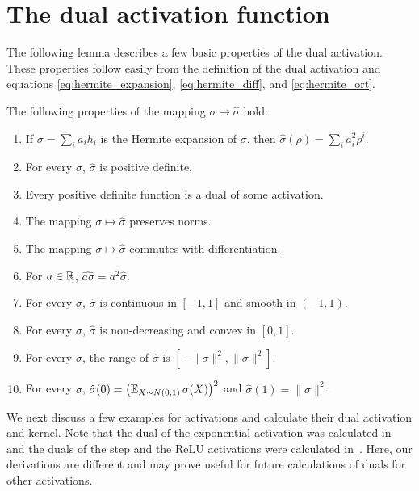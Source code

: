 \section{The dual activation function} \label{dualact:sec}
%
The following lemma describes a few basic properties of the dual activation. These properties follow easily from the definition of the dual activation and equations
\eqref{eq:hermite_expansion}, \eqref{eq:hermite_diff}, and
\eqref{eq:hermite_ort}.
\begin{lemma}\label{lem:dual_activation}
The following properties of the mapping $\sigma\mapsto \hat\sigma$ hold:
\begin{enumerate}[label=(\alph*)]
\item If $\sigma =\sum_{i} a_i h_i$ is the Hermite expansion of
  $\sigma$, then  $\hat\sigma(\rho) = \sum_i a_i^2 \rho^i$.
	\label{lem:da_1}
\item For every $\sigma$, $\hat\sigma$ is positive definite.
	\label{lem:da_2}
\item Every positive definite function is a dual of some activation.
	\label{lem:da_3}
\item The mapping $\sigma\mapsto\hat\sigma$ preserves norms.
	\label{lem:da_4}
\item The mapping $\sigma\mapsto\hat\sigma$ commutes with differentiation.
	\label{lem:da_5}
\item For $a\in{\mathbb R}$, $\widehat{a\sigma} = a^2\hat\sigma$.
	\label{lem:da_6}
\item For every $\sigma$, $\hat{\sigma}$ is continuous in $[-1,1]$ and smooth in $(-1,1)$.
	\label{lem:da_7}
\item For every $\sigma$, $\hat{\sigma}$ is non-decreasing and convex in $[0,1]$.
	\label{lem:da_8}
\item For every $\sigma$, the range of $\hat{\sigma}$ is $\left[-\|\sigma\|^2,\|\sigma\|^2\right]$.
\item For every $\sigma$, $\hat \sigma(0) = \left(\operatorname*{\mathbb{E}}_{X\sim N(0,1)}\sigma(X)\right)^2$ and $\hat{\sigma}(1)=\|\sigma\|^2$.
	\label{lem:da_9}
\end{enumerate}
\end{lemma}
\noindent
We next discuss a few examples for activations and calculate their dual
activation and kernel. Note that the dual of the exponential activation
was calculated in~\cite{mairal2014convolutional} and the duals of the step and the ReLU activations were calculated in~\cite{cho2009kernel}.
Here, our derivations are different and
may prove useful for future calculations of duals for other activations.

